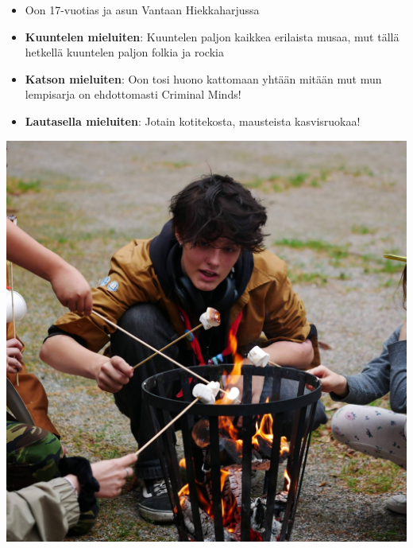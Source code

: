 \begin{FaktaLaatikko}[Leo]

\begin{multicols}{2}
\vspace*{-0.64cm}
\vspace*{-0.16cm}
\begin{itemize}
\item Oon 17-vuotias ja asun Vantaan Hiekkaharjussa
\item \textbf{Kuuntelen mieluiten}: Kuuntelen paljon kaikkea erilaista musaa, mut tällä hetkellä kuuntelen paljon folkia ja rockia
\item \textbf{Katson mieluiten}: Oon tosi huono kattomaan yhtään mitään mut mun lempisarja on ehdottomasti Criminal Minds!
\item \textbf{Lautasella mieluiten}: Jotain kotitekosta, mausteista kasvisruokaa!
\end{itemize}
\columnbreak

\includegraphics[width=1.02\columnwidth]{assets/johtajarusakot-leo.jpg}
\end{multicols}

\end{FaktaLaatikko}
\vspace*{-0.64cm}
